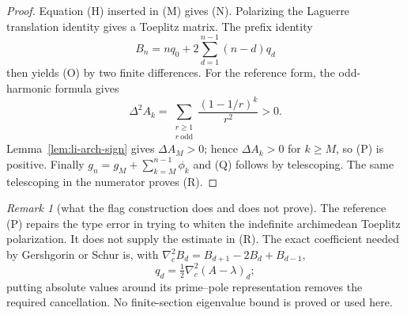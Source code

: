 \documentclass[11pt]{amsart}
\theoremstyle{definition}
\theoremstyle{remark}
\newtheorem{remark}[theorem]{Remark}
\theoremstyle{definition}
\begin{document}
\begin{proof}
Equation (H) inserted in (M) gives (N).  Polarizing the Laguerre translation
identity gives a Toeplitz matrix.  The prefix identity
\[
 B_n=nq_0+2\sum_{d=1}^{n-1}(n-d)q_d
\]
then yields (O) by two finite differences.  For the reference form, the
odd-harmonic formula gives
\[
 \Delta^2A_k=\sum_{\substack{r\ge1\\r\ \mathrm{odd}}}
             \frac{(1-1/r)^k}{r^2}>0.
\]
Lemma~\ref{lem:li-arch-sign} gives $\Delta A_M>0$; hence
$\Delta A_k>0$ for $k\ge M$, so (P) is
positive.  Finally
$g_n=g_M+\sum_{k=M}^{n-1}\phi_k$ and (Q) follows by telescoping.  The same
telescoping in the numerator proves (R).
\end{proof}

\begin{remark}[what the flag construction does and does not prove]
\label{rmk:a1-flag-gate}
The reference (P) repairs the type error in trying to whiten the indefinite
archimedean Toeplitz polarization.  It does not supply the estimate in (R).
The exact coefficient needed by Gershgorin or Schur is, with
$\nabla_c^2B_d=B_{d+1}-2B_d+B_{d-1}$,
\[
 q_d=\tfrac12\nabla_c^2(A-\lambda)_d;
\]
putting absolute values around its prime--pole representation removes the
required cancellation.  No finite-section eigenvalue bound is proved or used
here.
\end{remark}
\end{document}
